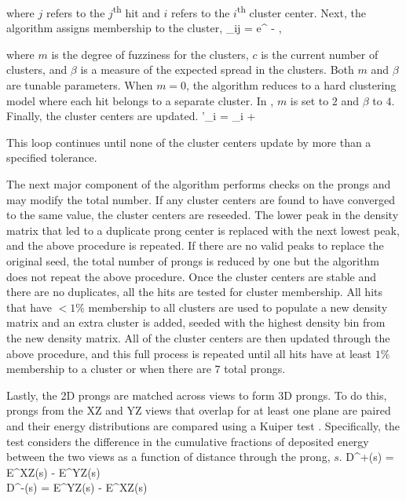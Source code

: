 \n where $j$ refers to the $j$\textsuperscript{th} hit and $i$ refers to the $i$\textsuperscript{th} cluster center. Next, the algorithm assigns membership to the cluster,
\beq
\mu_{ij} = e^{ -  },
\label{eq:Fuzzymu}
\eeq

\n where $m$ is the degree of fuzziness for the clusters, $c$ is the current number of clusters, and $\beta$ is a measure of the expected spread in the clusters. Both $m$ and $\beta$ are tunable parameters. When $m = 0$, the algorithm reduces to a hard clustering model where each hit belongs to a separate cluster. In \nova, $m$ is set to $2$ and $\beta$ to $4$. Finally, the cluster centers are updated.
\beq
\theta'_i = \theta_i + 
\label{eq:FuzzyUpdate}
\eeq

\n This loop continues until none of the cluster centers update by more than a specified tolerance.

The next major component of the algorithm performs checks on the prongs and may modify the total number. If any cluster centers are found to have converged to the same value, the cluster centers are reseeded. The lower peak in the density matrix that led to a duplicate prong center is replaced with the next lowest peak, and the above procedure is repeated. If there are no valid peaks to replace the original seed, the total number of prongs is reduced by one but the algorithm does not repeat the above procedure. Once the cluster centers are stable and there are no duplicates, all the hits are tested for cluster membership. All hits that have $< 1\%$ membership to all clusters are used to populate a new density matrix and an extra cluster is added, seeded with the highest density bin from the new density matrix. All of the cluster centers are then updated through the above procedure, and this full process is repeated until all hits have at least $1\%$ membership to a cluster or when there are $7$ total prongs.

Lastly, the 2D prongs are matched across views to form 3D prongs. To do this, prongs from the XZ and YZ views that overlap for at least one plane are paired and their energy distributions are compared using a Kuiper test \cite{ref:Kuiper}. Specifically, the test considers the difference in the cumulative fractions of deposited energy between the two views as a function of distance through the prong, $s$.
\beqa
D^+(s) = E^{XZ}(s) - E^{YZ}(s) \nonumber\\
D^-(s) = E^{YZ}(s) - E^{XZ}(s)
\label{eq:FuzzyDs}
\eeqa

